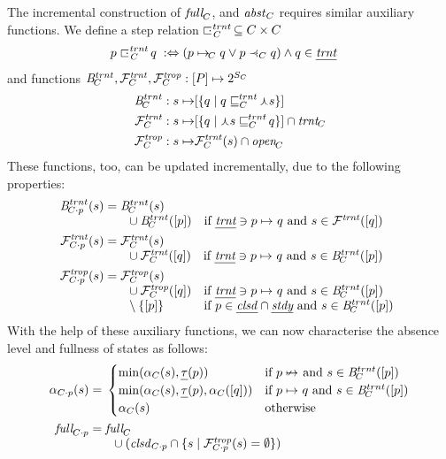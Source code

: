 \documentclass{article}
\begin{document}
%
The incremental construction of $\Full[C]$, and $\Absent[C]$ requires similar auxiliary functions. We define a step relation ${\transientstep[C]}\subseteq C\times C$
%
\begin{align*}
p \transientstep[C] q \;\iffdef\; & (p\stepany[C] q \vee p\gostep[C] q) \wedge q\in\pTransient
\end{align*}
%
and functions $\BackTrans[C],\ForwTrans[C],\ForwTrOp[C]:[P]\mapsto 2^{S_C}$
%
\begin{align*}
\BackTrans[C] : s\mapsto & \stat{\gensetof{q}{q\transienttoeq[C] \prm s}} \\
\ForwTrans[C] : s\mapsto & \stat{\gensetof{q}{\prm s\transienttoeq[C] q}}\cap \Transient[C] \\
\ForwTrOp[C] : s\mapsto & \ForwTrans[C](s) \cap \Open[C]
\end{align*}
%
These functions, too, can be updated incrementally, due to the following properties:
%
\begin{align*}
\BackTrans[\addp Cp](s) = {}
 & \begin{array}[t]{@{}ll}
 	\BackTrans[C](s) \\
 	{\enspace} \cup \BackTrans[C]([p]) & \text{if } \pTransient\ni p\stepany q \text{ and } s\in \ForwTrans([q])
 \end{array} \\
\ForwTrans[\addp Cp](s) = {}
 & \begin{array}[t]{@{}ll}
   \ForwTrans[C](s) \\
   {\enspace} \cup \ForwTrans[C]([q]) & \text{if } \pTransient\ni p\stepany q \text{ and } s\in \BackTrans[C](\stat p)
   \end{array} \\
\ForwTrOp[\addp Cp](s) = {}
& \begin{array}[t]{@{}ll}
	\ForwTrOp[C](s) \\
	{\enspace} \cup \ForwTrOp[C]([q]) & \text{if } \pTransient\ni  p\stepany q \text{ and } s\in \BackTrans[C](\stat p) \\
	{\enspace} \setminus \setof{\stat p} & \text{if } p\in \pClosed \cap \pSteady \text{ and } s\in \BackTrans[C](\stat p)
\end{array} 
\end{align*}
%
With the help of these auxiliary functions, we can now characterise the absence level and fullness of states as follows:
%
\begin{align*}
\ALevel[\addp Cp](s) = {}
 & \begin{cases}
   \min(\ALevel[C](s),\pTLevel(p)) & \text{if } p\;{\nstepany} \text{ and } s\in \BackTrans[C]([p]) \\
   \min(\ALevel[C](s),\pTLevel(p),\ALevel[C]([q])) & \text{if } p\stepany q \text{ and } s\in \BackTrans[C]([p]) \\
   \ALevel[C](s) & \text{otherwise}
   \end{cases} \\
\Full[\addp Cp] = {}
  & \begin{array}[t]{@{}ll}
  	\Full[C] \\
  	{\enspace}\cup (\Closed[\addp Cp] \cap \gensetof{s}{\ForwTrOp[\addp Cp](s) = \emptyset})
    \end{array}
\end{align*}
\end{document}
